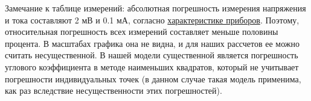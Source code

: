 \documentclass[12pt]{article}
\begin{document}
\begin{thebibliography}
\begin{table}[H]
\begin{minipage}[c]{\textwidth}
\begin{tabular}{|m{0.51 cm}|c|c|c||c||c|c|c||c||c|c|c|}
    \end{tabular}
    \end{minipage}
    \vspace{0.5cm}
\end{table} %
Замечание к таблице измерений: абсолютная погрешность измерения напряжения и тока составляют 2 мВ и 0.1 мА, согласно \hyperref[sec: characteristics]{характеристике приборов}. Поэтому, относительная погрешность всех измерений составляет меньше половины процента. В масштабах графика она не видна, и для наших рассчетов ее можно считать несущественной. В нашей модели существенной является погрешность углового коэффициента в методе наименьших квадратов, который не учитывает погрешности индивидуальных точек (в данном случае такая модель применима, как раз вследствие несущественности этих погрешностей).

\end{thebibliography}
\end{document}
